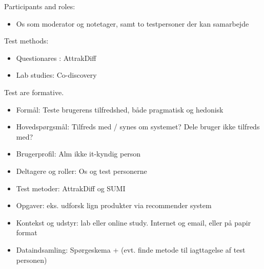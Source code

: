 Participants and roles:
\begin{itemize}
\item Os som moderator og notetager, samt to testpersoner der kan samarbejde
\end{itemize}

Test methods:
\begin{itemize}
\item Questionares : AttrakDiff
\item Lab studies: Co-discovery
\end{itemize}
Test are formative.

\begin{itemize}
\item Form\aa l: Teste brugerens tilfredshed, både pragmatisk og hedonisk
\item Hovedspørgsmål: Tilfreds med / synes om systemet? Dele bruger ikke tilfreds med?
\item Brugerprofil: Alm ikke it-kyndig person
\item Deltagere og roller: Os og test personerne
\item Test metoder:  AttrakDiff og SUMI
\item Opgaver: eks. udforsk lign produkter via recommender system
\item Kontekst og udstyr: lab eller online study. Internet og email, eller på papir format
\item Dataindsamling: Spørgeskema + (evt. finde metode til iagttagelse af test personen)
\end{itemize}
